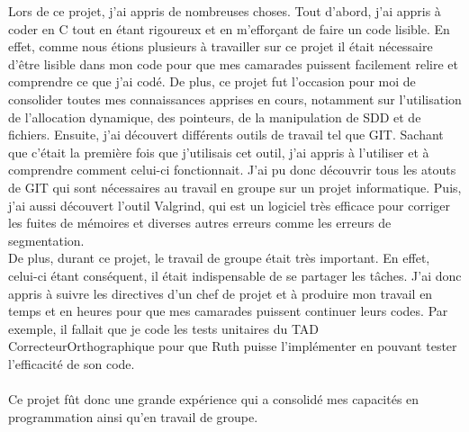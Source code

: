 Lors de ce projet, j'ai appris de nombreuses choses. Tout d'abord, j'ai appris à coder en C tout en étant rigoureux et en m'efforçant de faire un code lisible. En effet, comme nous étions plusieurs à travailler sur ce projet il était nécessaire d'être lisible dans mon code pour que mes camarades puissent facilement relire et comprendre ce que j'ai codé. De plus, ce projet fut l'occasion pour moi de consolider toutes mes connaissances apprises en cours, notamment sur l'utilisation de l'allocation dynamique, des pointeurs, de la manipulation de SDD et de fichiers. Ensuite, j'ai découvert différents outils de travail tel que GIT. Sachant que c'était la première fois que j'utilisais cet outil, j'ai appris à l'utiliser et à comprendre comment celui-ci fonctionnait. J'ai pu donc découvrir tous les atouts de GIT qui sont nécessaires au travail en groupe sur un projet informatique. Puis, j'ai aussi découvert l'outil Valgrind, qui est un logiciel très efficace pour corriger les fuites de mémoires et diverses autres erreurs comme les erreurs de segmentation.\\

De plus, durant ce projet, le travail de groupe était très important. En effet, celui-ci étant conséquent, il était indispensable de se partager les tâches. J'ai donc appris à suivre les directives d'un chef de projet et à produire mon travail en temps et en heures pour que mes camarades puissent continuer leurs codes. Par exemple, il fallait que je code les tests unitaires du TAD CorrecteurOrthographique pour que Ruth puisse l'implémenter en pouvant tester l'efficacité de son code.\\\\
Ce projet fût donc une grande expérience qui a consolidé mes capacités en programmation ainsi qu'en travail de groupe.
